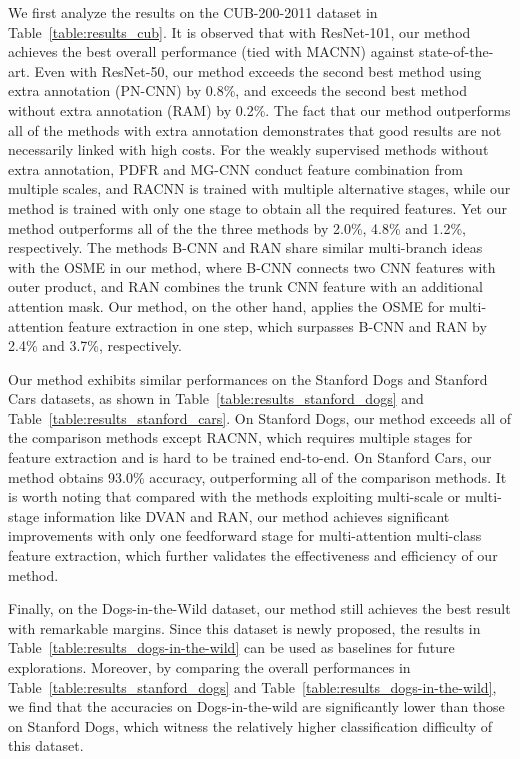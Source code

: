 \documentclass[runningheads]{llncs}
\begin{document}
We first analyze the results on the CUB-200-2011 dataset in Table~\ref{table:results_cub}.
It is observed that with ResNet-101, our method achieves the best overall performance (tied with MACNN) against state-of-the-art.
Even with ResNet-50, our method exceeds the second best method using extra annotation (PN-CNN) by 0.8\%, and exceeds the second best method without extra annotation (RAM) by 0.2\%.
The fact that our method outperforms all of the methods with extra annotation demonstrates that good results are not necessarily linked with high costs.
For the weakly supervised methods without extra annotation, PDFR and MG-CNN conduct feature combination from multiple scales, and RACNN is trained with multiple alternative stages, while our method is trained with only one stage to obtain all the required features.
Yet our method outperforms all of the the three methods by 2.0\%, 4.8\% and 1.2\%, respectively.
The methods B-CNN and RAN share similar multi-branch ideas with the OSME in our method, where B-CNN connects two CNN features with outer product, and RAN combines the trunk CNN feature with an additional attention mask.
Our method, on the other hand, applies the OSME for multi-attention feature extraction in one step, which surpasses B-CNN and RAN by 2.4\% and 3.7\%, respectively.

Our method exhibits similar performances on the Stanford Dogs and Stanford Cars datasets, as shown in Table~\ref{table:results_stanford_dogs} and Table~\ref{table:results_stanford_cars}.
On Stanford Dogs, our method exceeds all of the comparison methods except RACNN, which requires multiple stages for feature extraction and is hard to be trained end-to-end.
On Stanford Cars, our method obtains 93.0\% accuracy, outperforming all of the comparison methods. It is worth noting that compared with the methods exploiting multi-scale or multi-stage information like DVAN and RAN, our method achieves significant improvements with only one feedforward stage for multi-attention multi-class feature extraction, which further validates the effectiveness and efficiency of our method.

Finally, on the Dogs-in-the-Wild dataset, our method still achieves the best result with remarkable margins. Since this dataset is newly proposed, the results in Table~\ref{table:results_dogs-in-the-wild} can be used as baselines for future explorations. Moreover, by comparing the overall performances in Table~\ref{table:results_stanford_dogs} and Table~\ref{table:results_dogs-in-the-wild}, we find that the accuracies on Dogs-in-the-wild are significantly lower than those on Stanford Dogs, which witness the relatively higher classification difficulty of this dataset.
\end{document}
